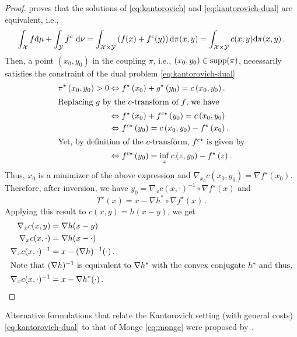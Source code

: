 \begin{proof}
\citet[Theorem 1.39]{santambrogio2015optimal} proves that the solutions of \eqref{eq:kantorovich} and \eqref{eq:kantorovich-dual} are equivalent, i.e.,
\begin{equation*}
	\int_{\mathcal{X}} f \mathrm{d} \mu+\int_{\mathcal{Y}} f^c \mathrm{~d} \nu=\int_{{\mathcal{X}} \times {\mathcal{Y}}}\left(f(x)+f^c(y)\right) \mathrm{d} \pi(x, y)=\int_{{\mathcal{X}} \times {\mathcal{Y}}} c(x, y) \mathrm{d} \pi(x, y)\,.
\end{equation*}
Then, a point $(x_0, y_0)$ in the coupling $\pi$, i.e., $(x_0, y_0) \in \operatorname{supp}(\pi)$, necessarily satisfies the constraint of the dual problem \eqref{eq:kantorovich-dual}
\begin{align*}
\pi^{\star}\left(x_0, y_0\right)>0 & \Leftrightarrow f^{\star}\left(x_0\right)+g^{\star}\left(y_0\right)=c\left(x_0, y_0\right). \\
\intertext{Replacing $g$ by the $c$-transform of $f$, we have}
& \Leftrightarrow f^{\star}\left(x_0\right)+ f^{c\star}\left(y_0\right)=c\left(x_0, y_0\right) \\
& \Leftrightarrow f^{c\star}\left(y_0\right)=c\left(x_0, y_0\right)-f^{\star}\left(x_0\right). \\
\intertext{Yet, by definition of the $c$-transform, $f^{c\star}$ is given by}
& \Leftrightarrow f^{c\star}\left(y_0\right)= \inf_z c\left(z, y_0\right)-f^{\star}\left(z\right).
\end{align*}
Thus, $x_0$ is a minimizer of the above expression and $\nabla_{x_0} c\left(x_0, y_0\right)=\nabla f^{\star}\left(x_0\right)$.  
Therefore, after inversion, we have $y_0=\nabla_x c(x, \cdot)^{-1} \circ \nabla f^{\star}(x)$ and
\begin{equation*}
		T^{\star}(x)=x-\nabla h^* \circ \nabla f^{\star}(x)\,.
	\end{equation*}
Applying this result to $c(x, y) = h(x-y)$, we get 
\begin{align*}
  \nabla_x c(x, y) & =\nabla h(x-y) \\
  \nabla_x c(x, \cdot) & =\nabla h(x-\cdot) \\
  \nabla_x c(x, \cdot)^{-1} & =x-(\nabla h)^{-1}(\cdot)\,. \\ 
\intertext{Note that $(\nabla h)^{-1}$ is equivalent to $\nabla h^*$ with the convex conjugate $h^*$ and thus,}
  \nabla_x c(x, \cdot)^{-1} & =x-\nabla h^*(\cdot)\,.	
\end{align*}
\end{proof}
Alternative formulations that relate the Kantorovich setting (with general costs) \eqref{eq:kantorovich-dual} to that of Monge \eqref{eq:monge} were proposed by \citet{ruschendorf1991bounds, ruschendorf1991frechet, caffarelli2017allocation}. \\

